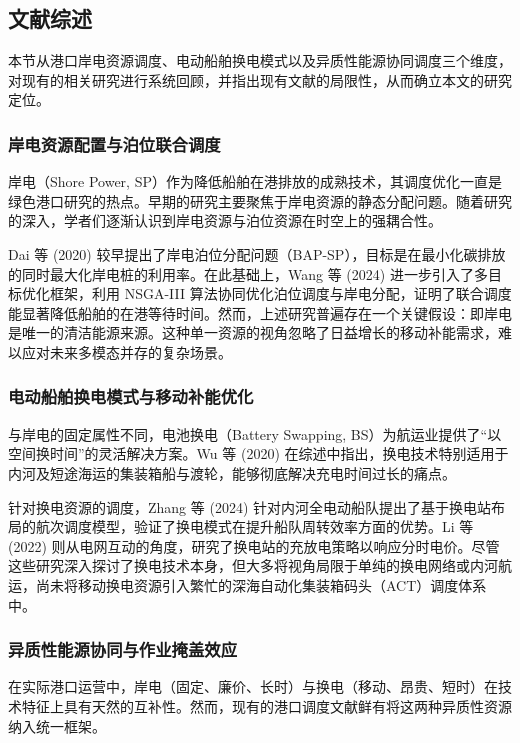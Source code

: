 \documentclass[UTF8, a4paper, 12pt]{ctexart}
\begin{document}
\subsection{文献综述}
\label{sec:lit_review}

本节从港口岸电资源调度、电动船舶换电模式以及异质性能源协同调度三个维度，对现有的相关研究进行系统回顾，并指出现有文献的局限性，从而确立本文的研究定位。

\subsubsection{岸电资源配置与泊位联合调度}
岸电（Shore Power, SP）作为降低船舶在港排放的成熟技术，其调度优化一直是绿色港口研究的热点。早期的研究主要聚焦于岸电资源的静态分配问题。随着研究的深入，学者们逐渐认识到岸电资源与泊位资源在时空上的强耦合性。

Dai 等 (2020) \cite{Dai2020} 较早提出了岸电泊位分配问题（BAP-SP），目标是在最小化碳排放的同时最大化岸电桩的利用率。在此基础上，Wang 等 (2024) \cite{Wang2024_SP} 进一步引入了多目标优化框架，利用 NSGA-III 算法协同优化泊位调度与岸电分配，证明了联合调度能显著降低船舶的在港等待时间。然而，上述研究普遍存在一个关键假设：即岸电是唯一的清洁能源来源。这种单一资源的视角忽略了日益增长的移动补能需求，难以应对未来多模态并存的复杂场景。

\subsubsection{电动船舶换电模式与移动补能优化}
与岸电的固定属性不同，电池换电（Battery Swapping, BS）为航运业提供了“以空间换时间”的灵活解决方案。Wu 等 (2020) \cite{Wu2020_Review} 在综述中指出，换电技术特别适用于内河及短途海运的集装箱船与渡轮，能够彻底解决充电时间过长的痛点。

针对换电资源的调度，Zhang 等 (2024) \cite{Zhang2024_Voyage} 针对内河全电动船队提出了基于换电站布局的航次调度模型，验证了换电模式在提升船队周转效率方面的优势。Li 等 (2022) \cite{Li2022_BSS} 则从电网互动的角度，研究了换电站的充放电策略以响应分时电价。尽管这些研究深入探讨了换电技术本身，但大多将视角局限于单纯的换电网络或内河航运，尚未将移动换电资源引入繁忙的深海自动化集装箱码头（ACT）调度体系中。

\subsubsection{异质性能源协同与作业掩盖效应}
在实际港口运营中，岸电（固定、廉价、长时）与换电（移动、昂贵、短时）在技术特征上具有天然的互补性。然而，现有的港口调度文献鲜有将这两种异质性资源纳入统一框架。
\end{document}

